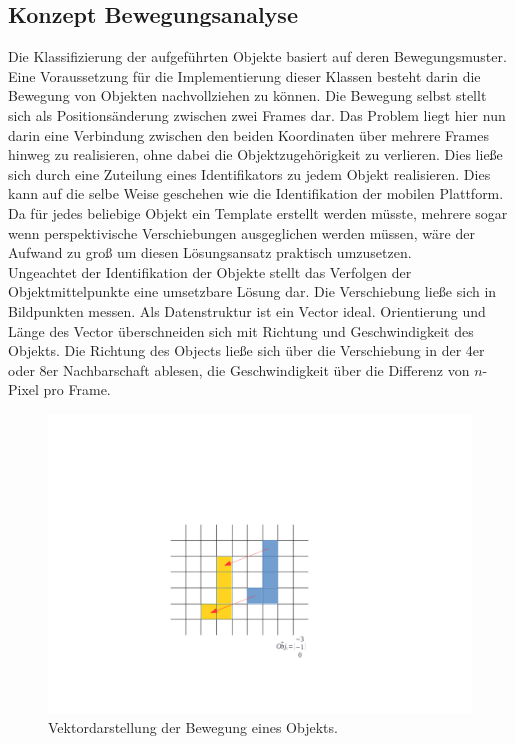 \subsection{Konzept Bewegungsanalyse}
Die Klassifizierung der aufgeführten Objekte basiert auf deren Bewegungsmuster. Eine Voraussetzung für die Implementierung dieser Klassen besteht darin die Bewegung von Objekten nachvollziehen zu können. Die Bewegung selbst stellt sich als Positionsänderung zwischen zwei Frames dar. Das Problem liegt hier nun darin eine Verbindung zwischen den beiden Koordinaten über mehrere Frames hinweg zu realisieren, ohne dabei die Objektzugehörigkeit zu verlieren. Dies ließe sich durch eine Zuteilung eines Identifikators zu jedem Objekt realisieren. Dies kann auf die selbe Weise geschehen wie die Identifikation der mobilen Plattform. Da für jedes beliebige Objekt ein Template erstellt werden müsste, mehrere sogar wenn perspektivische Verschiebungen ausgeglichen werden müssen, wäre der Aufwand zu groß um diesen Lösungsansatz praktisch umzusetzen.\\ Ungeachtet der Identifikation der Objekte stellt das Verfolgen der Objektmittelpunkte eine umsetzbare Lösung dar. Die Verschiebung ließe sich in Bildpunkten messen. Als Datenstruktur ist ein Vector ideal. Orientierung und Länge des Vector überschneiden sich mit Richtung und Geschwindigkeit des Objekts. Die Richtung des Objects ließe sich über die Verschiebung in der 4er oder 8er Nachbarschaft ablesen, die Geschwindigkeit über die Differenz von $n$-Pixel pro Frame.
\begin{figure}[H]
\centering
\includegraphics[width=0.9\linewidth]{../media/vec-obj1}
\caption[Vektor Objekt]{Vektordarstellung der Bewegung eines Objekts.}
\label{fig:vec-obj1}
\end{figure}

